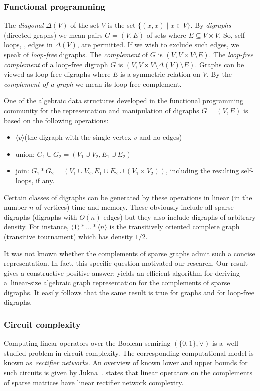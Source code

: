 \subsubsection{Functional programming}

%
%
The \emph{diagonal} $\Delta(V)$ of the set $V$ is the set $\{(x,x)\mid x\in V\}$.
By \emph{digraphs} (directed graphs) we mean pairs $G=(V,E)$ of sets where
$E\subseteq V\times V$.  So, self-loops, \ie, edges in $\Delta(V)$, are
permitted.  If we wish to exclude such edges, we speak of \emph{loop-free}
digraphs.  The \emph{complement} of $G$ is $(V, V\times V\setminus E)$.
The \emph{loop-free complement} of a loop-free digraph $G$ is
$(V, V\times V \setminus \Delta(V)\setminus E)$.  Graphs can be viewed
as loop-free digraphs where $E$ is a symmetric relation on $V$.  By the
\emph{complement of a graph} we mean its loop-free complement.

One of the algebraic data structures developed in the functional programming
community for the representation and manipulation of digraphs
$G=(V,E)$ is based on the following operations:
\begin{itemize}
\item $\langle v\rangle$\quad (the digraph with the single vertex $v$ and no edges)
\item union: $G_1 \cup G_2 = (V_1 \cup V_2, E_1 \cup E_2)$
\item join: $G_1 \ast G_2 = (V_1 \cup V_2, E_1 \cup E_2 \cup (V_1 \times V_2))$, including
  the resulting self-loops, if any.
\end{itemize}
Certain classes of digraphs can be generated by these operations
in linear (in the number $n$ of vertices) time and memory.  These obviously
include all sparse digraphs (digraphs with $O(n)$ edges) but they also include
digraphs of arbitrary density.  For instance,
$\langle 1\rangle \ast \dots \ast \langle n\rangle$
is the transitively oriented complete graph
(transitive tournament) which has density $1/2$.  %
%

It was not known whether the
complements of sparse graphs admit such a concise representation.
%
%
%
%
%
In fact, this specific question motivated our research.  %
Our result gives a constructive positive answer:
 yields an
efficient algorithm for deriving a~linear-size algebraic graph representation
for the complements of sparse digraphs.
%
%
It easily follows that the same result is true for graphs and for
loop-free digraphs.  %

\subsubsection{Circuit complexity}  Computing linear operators over
the Boolean semiring $(\{0,1\}, \lor)$ is a~well-studied problem
in circuit complexity. The corresponding computational model is known
as~\emph{rectifier networks}. An overview of known lower and upper bounds for
such circuits is given by Jukna~\cite[Section~13.6]{DBLP:books/daglib/0028687}.
 states that linear operators on
the %
complements of
sparse matrices have linear rectifier network complexity.

